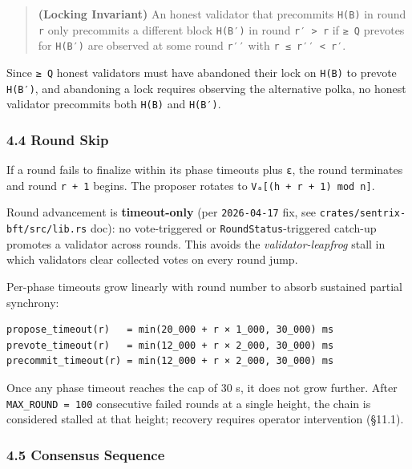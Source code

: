 \documentclass[11pt,a4paper]{article}
\begin{document}
\begin{quote}
\textbf{(Locking Invariant)} An honest validator that precommits
\texttt{H(B)} in round \texttt{r} only precommits a different block
\texttt{H(B′)} in round \texttt{r′\ \textgreater{}\ r} if \texttt{≥\ Q}
prevotes for \texttt{H(B′)} are observed at some round \texttt{r′′} with
\texttt{r\ ≤\ r′′\ \textless{}\ r′}.
\end{quote}

Since \texttt{≥\ Q} honest validators must have abandoned their lock on
\texttt{H(B)} to prevote \texttt{H(B′)}, and abandoning a lock requires
observing the alternative polka, no honest validator precommits both
\texttt{H(B)} and \texttt{H(B′)}.

\hypertarget{44-round-skip}{%
\subsubsection{4.4 Round Skip}\label{44-round-skip}}

If a round fails to finalize within its phase timeouts plus \texttt{ε},
the round terminates and round \texttt{r\ +\ 1} begins. The proposer
rotates to \texttt{Vₐ{[}(h\ +\ r\ +\ 1)\ mod\ n{]}}.

Round advancement is \textbf{timeout-only} (per \texttt{2026-04-17} fix,
see \texttt{crates/sentrix-bft/src/lib.rs} doc): no vote-triggered or
\texttt{RoundStatus}-triggered catch-up promotes a validator across
rounds. This avoids the \emph{validator-leapfrog} stall in which
validators clear collected votes on every round jump.

Per-phase timeouts grow linearly with round number to absorb sustained
partial synchrony:

\begin{verbatim}
propose_timeout(r)   = min(20_000 + r × 1_000, 30_000) ms
prevote_timeout(r)   = min(12_000 + r × 2_000, 30_000) ms
precommit_timeout(r) = min(12_000 + r × 2_000, 30_000) ms
\end{verbatim}

Once any phase timeout reaches the cap of 30 s, it does not grow
further. After \texttt{MAX\_ROUND\ =\ 100} consecutive failed rounds at
a single height, the chain is considered stalled at that height;
recovery requires operator intervention (§11.1).

\hypertarget{45-consensus-sequence}{%
\subsubsection{4.5 Consensus Sequence}\label{45-consensus-sequence}}
\end{document}
